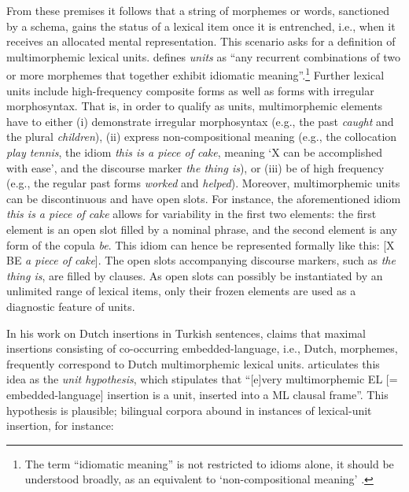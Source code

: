 From these premises it follows that a string of morphemes or words, sanctioned by a schema, gains the status of a lexical item once it is entrenched, i.e., when it receives an allocated mental representation. This scenario asks for a definition of multimorphemic lexical units. \citet[][90]{backus-units-2003} defines \textit{units} as ``any recurrent combinations of two or more morphemes that together exhibit idiomatic meaning''.\footnote{The term ``idiomatic meaning'' is not restricted to idioms alone, it should be understood broadly, as an equivalent to `non-compositional meaning' \citep[cf.][86]{backus-units-2003}.} Further lexical units include high-frequency composite forms as well as forms with irregular morphosyntax. That is, in order to qualify as units, multimorphemic elements have to either (i) demonstrate irregular morphosyntax (e.g., the past \textit{caught} and the plural \textit{children}), (ii) express non-compositional meaning (e.g., the collocation \textit{play tennis}, the idiom \textit{this is a piece of cake}, meaning `X can be accomplished with ease', and the discourse marker \textit{the thing is}), or (iii) be of high frequency (e.g., the regular past forms \textit{worked} and \textit{helped}). Moreover, multimorphemic units can be discontinuous and have open slots. For instance, the aforementioned idiom \textit{this is a piece of cake} allows for variability in the first two elements: the first element is an open slot filled by a nominal phrase, and the second element is any form of the copula \textit{be}. This idiom can hence be represented formally like this: [X BE \textit{a piece of cake}]. The open slots accompanying discourse markers, such as \textit{the thing is}, are filled by clauses. As open slots can possibly be instantiated by an unlimited range of lexical items, only their frozen elements are used as a diagnostic feature of units.

\begin{sloppypar}
In his work on Dutch insertions in Turkish sentences, \citet{backus-evidence-1999} claims that maximal insertions consisting of co-occurring embedded-language, i.e., Dutch, morphemes, frequently correspond to Dutch multimorphemic lexical units. \citet[][91]{backus-units-2003} articulates this idea as the \textit{unit hypothesis}, which stipulates that ``[e]very multimorphemic EL [= embedded-language] insertion is a unit, inserted into a ML clausal frame''. This hypothesis is plausible; bilingual corpora abound in instances of lexical-unit insertion, for instance:
\end{sloppypar}

